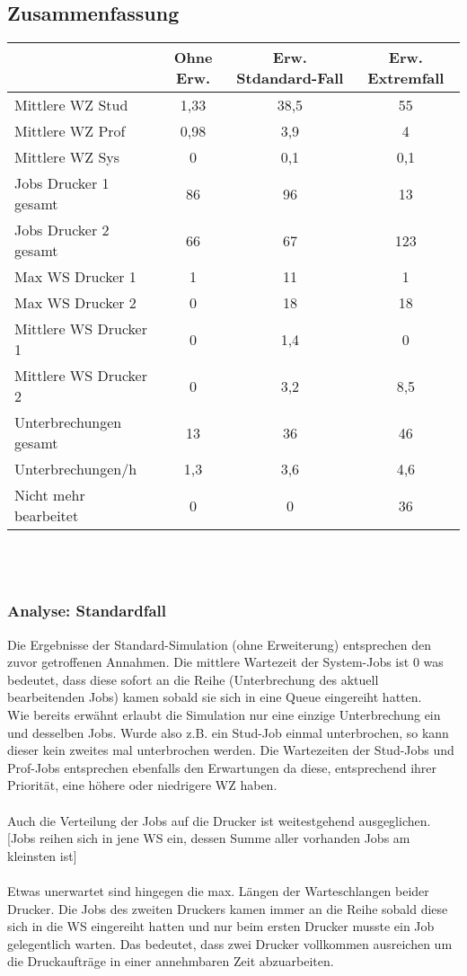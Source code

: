 \documentclass[12pt,a4paper]{article}
\begin{document}
	\subsection{Zusammenfassung}
	\begin{tabular}{|l|c|c|c|}
		\hline  & Ohne Erw. & Erw. Stdandard-Fall & Erw. Extremfall \\ 
		\hline Mittlere WZ Stud 	   & 1,33 & 38,5 & 55 \\ 
		\hline Mittlere WZ Prof 	   & 0,98 & 3,9 & 4 \\ 
		\hline Mittlere WZ Sys 		   & 0 & 0,1 & 0,1 \\ 
		\hline Jobs Drucker 1 gesamt   & 86 & 96 & 13 \\ 
		\hline Jobs Drucker 2 gesamt   & 66 & 67 & 123 \\ 
		\hline Max WS Drucker 1 	   & 1 & 11 & 1 \\ 
		\hline Max WS Drucker 2 	   & 0 & 18 & 18 \\ 
		\hline Mittlere WS Drucker 1   & 0 & 1,4 & 0 \\ 
		\hline Mittlere WS Drucker 2   & 0 & 3,2 & 8,5 \\
		\hline Unterbrechungen gesamt  & 13 & 36 & 46 \\  
		\hline Unterbrechungen/h 	   & 1,3 & 3,6 & 4,6 \\ 
		\hline Nicht mehr bearbeitet   & 0 & 0 & 36 \\
		\hline 
	\end{tabular}
	\\	
	\\
	\subsubsection{Analyse: Standardfall}
	Die Ergebnisse der Standard-Simulation (ohne Erweiterung) entsprechen den zuvor getroffenen Annahmen. Die mittlere Wartezeit der System-Jobs ist 0 was bedeutet, dass diese sofort an die Reihe
	 (Unterbrechung des aktuell bearbeitenden Jobs) kamen sobald sie sich in eine Queue eingereiht hatten. \\
	Wie bereits erwähnt erlaubt die Simulation nur eine einzige Unterbrechung ein und desselben Jobs. Wurde also z.B. ein Stud-Job einmal unterbrochen, so kann dieser kein zweites mal unterbrochen werden.
	Die Wartezeiten der Stud-Jobs und Prof-Jobs entsprechen ebenfalls den Erwartungen da diese, entsprechend ihrer Priorität, eine höhere oder niedrigere WZ haben.\\
	\\
	Auch die Verteilung der Jobs auf die Drucker ist weitestgehend ausgeglichen.
	[Jobs reihen sich in jene WS ein, dessen Summe aller vorhanden Jobs am kleinsten ist]\\
	\\
	Etwas unerwartet sind hingegen die max. Längen der Warteschlangen beider Drucker. Die Jobs des zweiten Druckers kamen immer an die Reihe sobald diese sich in die WS eingereiht hatten und nur beim ersten Drucker musste ein Job gelegentlich warten. Das bedeutet, dass zwei Drucker vollkommen ausreichen um die Druckaufträge in einer annehmbaren Zeit abzuarbeiten.\\
	
\end{document}
